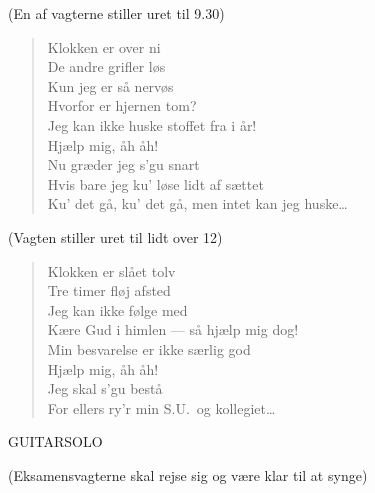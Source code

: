\documentclass[a4paper,11pt]{article}
\begin{document}
(En af vagterne stiller uret til 9.30)

\begin{verse}
Klokken er over ni\\
De andre grifler løs\\
Kun jeg er så nervøs\\
Hvorfor er hjernen tom? \\
Jeg kan ikke huske stoffet fra i år!\\
Hjælp mig, åh åh!\\
Nu græder jeg s'gu snart\\
Hvis bare jeg ku' løse lidt af sættet\\
Ku' det gå, ku' det gå, men intet kan jeg huske\dots\\
\end{verse}

(Vagten stiller uret til lidt over 12)

\begin{verse}
Klokken er slået tolv\\
Tre timer fløj afsted\\
Jeg kan ikke følge med\\
Kære Gud i himlen --- så hjælp mig dog!\\
Min besvarelse er ikke særlig god\\
Hjælp mig, åh åh!\\
Jeg skal s'gu bestå\\
For ellers ry'r min S.U.\ og kollegiet\dots\\
\end{verse}

GUITARSOLO

(Eksamensvagterne skal rejse sig og være klar til at synge)
\end{document}
